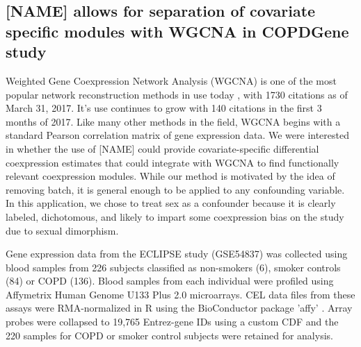 \subsection{{[}NAME{]} allows for separation of covariate specific modules with
WGCNA in COPDGene study}

Weighted Gene Coexpression Network Analysis (WGCNA) is one of the
most popular network reconstruction methods in use today \cite{wgcna1},
with 1730 citations as of March 31, 2017. It's use continues to grow
with 140 citations in the first 3 months of 2017. Like many other
methods in the field, WGCNA begins with a standard Pearson correlation
matrix of gene expression data. We were interested in whether the
use of {[}NAME{]} could provide covariate-specific differential coexpression
estimates that could integrate with WGCNA to find functionally relevant
coexpression modules. While our method is motivated by the idea of
removing batch, it is general enough to be applied to any confounding
variable. In this application, we chose to treat sex as a confounder
because it is clearly labeled, dichotomous, and likely to impart some
coexpression bias on the study due to sexual dimorphism.

Gene expression data from the ECLIPSE study (GSE54837)\cite{singh2014altered}
was collected using blood samples from 226 subjects classified as
non-smokers (6), smoker controls (84) or COPD (136). Blood samples
from each individual were profiled using Affymetrix Human Genome U133
Plus 2.0 microarrays. CEL data files from these assays were RMA-normalized\cite{irizarry2003exploration}
in R using the BioConductor package 'affy' \cite{gautier2004affy}.
Array probes were collapsed to 19,765 Entrez-gene IDs using a custom
CDF\cite{dai2005evolving} and the 220 samples for COPD or smoker
control subjects were retained for analysis. 

